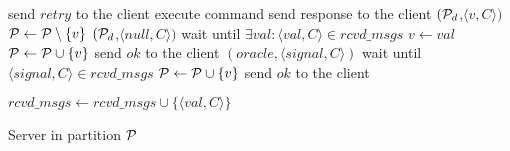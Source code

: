 \begin{algorithm}[t!]
\small

\begin{distribalgo}[1]


%
			\STATE send $retry$ to the client
		\ELSE
			\STATE execute command
			\STATE send response to the client
		\ENDIF
	\ENDINDENT
        \vspace{1.0mm}
				\STATE \rmcast$(\mathcal{P}_d$,$\langle v, C \rangle)$
				\STATE $\mathcal{P} \leftarrow \mathcal{P} \setminus \{v\}$
			\ELSE
				\STATE \rmcast$(\mathcal{P}_d$,$\langle null, C \rangle)$
			\ENDIF
		\ELSE
			\STATE wait until $\exists val : \langle val, C \rangle \in rcvd\_msgs$
				\STATE $v \leftarrow val$
				\STATE $\mathcal{P} \leftarrow \mathcal{P} \cup \{v\}$
			\ENDIF
		\ENDIF
		\STATE send $ok$ to the client
        	\ENDINDENT
	\vspace{1.0mm}
		\STATE \rmcast$(oracle, \langle signal, C \rangle )$
		\STATE wait until $\langle signal, C \rangle \in rcvd\_msgs$
		\STATE $\mathcal{P} \leftarrow \mathcal{P} \cup \{v\}$
		\STATE send $ok$ to the client
        	\ENDINDENT

    \vspace{1.0mm}

        \STATE $rcvd\_msgs \leftarrow rcvd\_msgs \cup \{\langle val, C \rangle\}$
    \ENDINDENT


\caption{Server in partition $\mathcal{P}$}
\label{alg:server_proxy}
\end{distribalgo}
\end{algorithm}